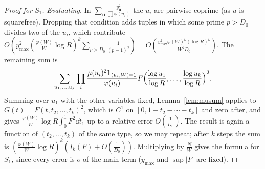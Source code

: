\begin{proof}[Proof for $S_1$]
\emph{Evaluating.} In $\sum_{\mathbf u}\frac{y_{\mathbf u}^2}{\prod\varphi(u_i)}$ the $u_i$ are pairwise coprime (as $u$ is squarefree). Dropping that condition adds tuples in which some prime $p>D_0$ divides two of the $u_i$, which contribute $O(y_{\max}^2(\frac{\varphi(W)}W\log R)^k\sum_{p>D_0}\frac1{(p-1)^2})=O(\frac{y_{\max}^2\varphi(W)^k(\log R)^k}{W^kD_0})$. The remaining sum is
\[
\sum_{u_1,\dots,u_k}\prod_i\frac{\mu(u_i)^2\mathbf 1_{(u_i,W)=1}}{\varphi(u_i)}F\Bigl(\frac{\log u_1}{\log R},\dots,\frac{\log u_k}{\log R}\Bigr)^2.
\]
Summing over $u_1$ with the other variables fixed, Lemma~\ref{lem:musum} applies to $G(t)=F(t,t_2,\dots,t_k)^2$, which is $C^1$ on $[0,1-t_2-\cdots-t_k]$ and zero after, and gives $\frac{\varphi(W)}W\log R\int_0^1F^2\dd t_1$ up to a relative error $O(\frac1{D_0})$. The result is again a function of $(t_2,\dots,t_k)$ of the same type, so we may repeat; after $k$ steps the sum is $(\frac{\varphi(W)}W\log R)^k(I_k(F)+O(\frac1{D_0}))$. Multiplying by $\frac NW$ gives the formula for $S_1$, since every error is $o$ of the main term ($y_{\max}$ and $\sup|F|$ are fixed).
\end{proof}

